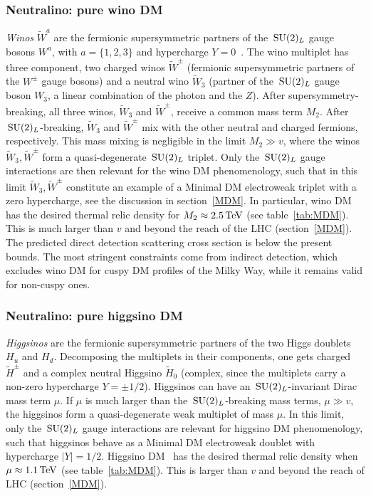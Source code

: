 \subsubsection{Neutralino: pure wino DM}
\label{Wino}
{\em Winos} $\tilde W^a$ are the fermionic supersymmetric partners of the $\,{\rm SU}(2)_L$ gauge bosons $W^a$,
with $a=\{1,2,3\}$ and hypercharge $Y=0$~\cite{Wino}.
The wino multiplet has three component,  two charged winos $\tilde W^\pm$ (fermionic supersymmetric partners of the $W^\pm$ gauge bosons)
and a neutral wino $\tilde W_3$ (partner of the $\,{\rm SU}(2)_L$ gauge boson $W_3$,
a linear combination of the photon and the $Z$).
After supersymmetry-breaking, all three winos, $\tilde W_{3}$ and $\tilde W^{\pm}$, receive a common mass term $M_2$.
After $\,{\rm SU}(2)_L$-breaking, $\tilde{W}_3$ and $\tilde{W}^\pm$
mix with the other neutral and charged fermions, respectively. 
This mass mixing is negligible in the limit $M_2 \gg v$, where 
the winos $\tilde W_3, \tilde W^\pm$ form a quasi-degenerate $\,{\rm SU}(2)_L$ triplet.
Only the $\,{\rm SU}(2)_L$ gauge interactions are then relevant for the wino DM phenomenology,
such that in this limit $\tilde W_3, \tilde W^\pm$  constitute an example of  a Minimal DM electroweak triplet with a zero hypercharge, see
the discussion in section~\ref{MDM}.
In particular, wino DM has the desired thermal relic density for $M_2\approx2.5\,{\rm TeV}$ (see table~\ref{tab:MDM}).
This is much larger than $v$ and beyond the reach of the LHC (section~\ref{MDM}).
The predicted direct detection scattering cross section is below the present bounds. The most stringent constraints come from indirect detection, which excludes wino DM for cuspy DM profiles of the Milky Way, while it remains valid for non-cuspy ones. 

\subsubsection{Neutralino: pure higgsino DM}
\label{Higgsino}
{\em Higgsinos} are the fermionic supersymmetric partners of the two Higgs doublets $H_{u}$ and
$H_{d}$.
Decomposing the multiplets in their components, one gets charged $\tilde{H}^\pm$
and a complex neutral Higgsino $\tilde{H}_0$ (complex, since the multiplets carry a non-zero
hypercharge $Y=\pm 1/2$).
Higgsinos can have an $\,{\rm SU}(2)_L$-invariant Dirac mass term $\mu$.
If $\mu$ is much larger than the $\,{\rm SU}(2)_L$-breaking mass terms, $\mu \gg v$,
the higgsinos form a quasi-degenerate weak multiplet of mass $\mu$.
In this limit, only the $\,{\rm SU}(2)_L$ gauge interactions are relevant for higgsino DM phenomenology,
such that higgsinos behave as a Minimal DM electroweak doublet with hypercharge $|Y| = 1/2$.
Higgsino DM~\cite{Higgsino:DM} has the desired thermal relic density when $ \mu \approx 1.1\,{\rm TeV}$ (see table~\ref{tab:MDM}).
This is larger than $v$ and beyond the reach of LHC (section~\ref{MDM}).

